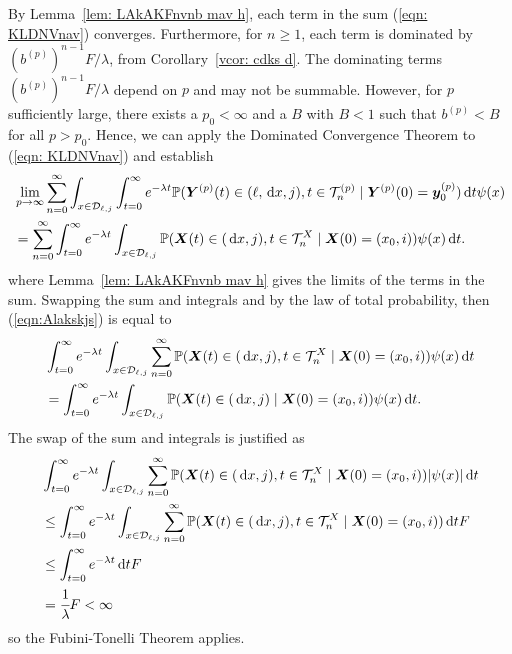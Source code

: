 By Lemma~\ref{lem: LAkAKFnvnb mav h}, each term in the sum (\ref{eqn: KLDNVnav}) converges. Furthermore, for \(n\geq 1\), each term is dominated by \(\left(b^{(p)}\right)^{n-1}F/\lambda\), from Corollary~\ref{vcor: cdks d}. The dominating terms \(\left(b^{(p)}\right)^{n-1}F/\lambda\) depend on \(p\) and may not be summable. However, for \(p\) sufficiently large, there exists a \(p_0<\infty\) and a \(B\) with \(B<1\) such that \(b^{(p)}<B\) for all \(p>p_0\). Hence, we can apply the Dominated Convergence Theorem to (\ref{eqn: KLDNVnav}) and establish  
\begin{align}
	&\lim_{p\to\infty} \sum_{n=0}^\infty\int_{x\in\mathcal D_{\ell,j}}\int_{t=0}^\infty e^{-\lambda t} \mathbb P( {\boldsymbol Y}^{(p)}(t) \in (\ell, \, \mathrm{d} x, j), t\in\mathcal T_n^{(p)} \mid \nonumber 
	\boldsymbol Y^{(p)}(0)=\boldsymbol y_0^{(p)})\, \mathrm{d} t \psi(x)  \nonumber
	\\&= \sum_{n=0}^\infty\int_{t=0}^\infty e^{-\lambda t}  \int_{x\in\mathcal{D}_{\ell,j}}\mathbb P(\boldsymbol X(t)\in(\, \mathrm{d} x, j), t\in\mathcal T_n^X 
	\mid \boldsymbol X(0)=(x_0,i)) 
	\psi(x)\, \mathrm{d} t. \label{eqn:Alakskjs}
\end{align}
where Lemma~\ref{lem: LAkAKFnvnb mav h} gives the limits of the terms in the sum. Swapping the sum and integrals and by the law of total probability, then (\ref{eqn:Alakskjs}) is equal to 
\begin{align}
	& \int_{t=0}^\infty e^{-\lambda t}  \int_{x\in\mathcal{D}_{\ell,j}}\sum_{n=0}^\infty\mathbb P(\boldsymbol X(t)\in(\, \mathrm{d} x, j), t\in\mathcal T_n^X 
	\mid \boldsymbol X(0)=(x_0, i))\psi(x)\, \mathrm{d} t \nonumber
	\\&= \int_{t=0}^\infty e^{-\lambda t}  \int_{x\in\mathcal{D}_{\ell,j}} \mathbb P(\boldsymbol X(t)\in(\, \mathrm{d} x, j)  
	\mid \boldsymbol X(0)=(x_0, i))\psi(x)\, \mathrm{d} t. \nonumber
\end{align}
The swap of the sum and integrals is justified as 
\begin{align}
	& \int_{t=0}^\infty e^{-\lambda t}  \int_{x\in\mathcal{D}_{\ell,j}}\sum_{n=0}^\infty\mathbb P(\boldsymbol X(t)\in(\, \mathrm{d} x, j), t\in\mathcal T_n^X 
	\mid \boldsymbol X(0)=(x_0, i))|\psi(x)|\, \mathrm{d} t \nonumber
	\\&\leq\int_{t=0}^\infty e^{-\lambda t}  \int_{x\in\mathcal{D}_{\ell,j}}\sum_{n=0}^\infty\mathbb P(\boldsymbol X(t)\in(\, \mathrm{d} x, j), t\in\mathcal T_n^X 
	\mid \boldsymbol X(0)=(x_0, i))\, \mathrm{d} t  F\nonumber
	\\&\leq\int_{t=0}^\infty e^{-\lambda t} \, \mathrm{d} t  F\nonumber
	\\&=\cfrac{1}{\lambda}F<\infty
\end{align}
so the Fubini-Tonelli Theorem applies. 

